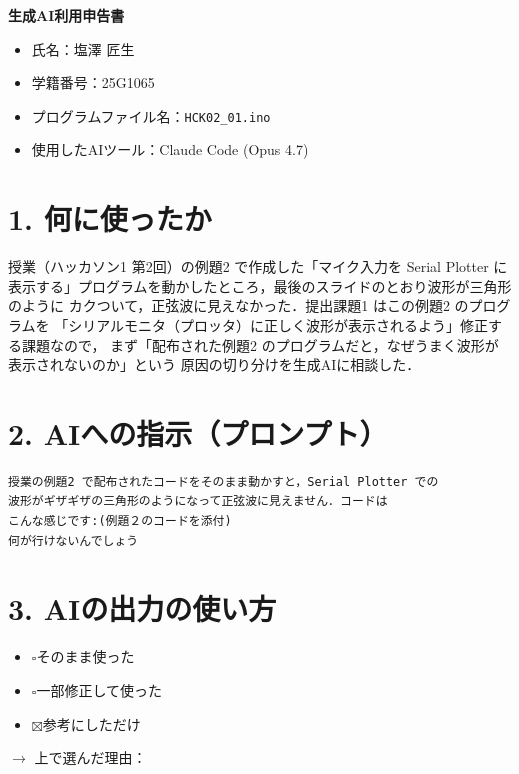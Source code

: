 \documentclass[a4paper,11pt,dvipdfmx]{jsarticle}
\newcommand{\cboxon}{$\boxtimes$}
\newcommand{\cboxoff}{$\square$}
\begin{document}
{\LARGE\bfseries 生成AI利用申告書}

\begin{itemize}
  \item 氏名：塩澤 匠生
  \item 学籍番号：25G1065
  \item プログラムファイル名：\texttt{HCK02\_01.ino}
  \item 使用したAIツール：Claude Code (Opus 4.7)
\end{itemize}

\section*{1. 何に使ったか}
授業（ハッカソン1 第2回）の例題2 で作成した「マイク入力を Serial Plotter に
表示する」プログラムを動かしたところ，最後のスライドのとおり波形が三角形のように
カクついて，正弦波に見えなかった．提出課題1 はこの例題2 のプログラムを
「シリアルモニタ（プロッタ）に正しく波形が表示されるよう」修正する課題なので，
まず「配布された例題2 のプログラムだと，なぜうまく波形が表示されないのか」という
原因の切り分けを生成AIに相談した．

\section*{2. AIへの指示（プロンプト）}
\begin{lstlisting}
授業の例題2 で配布されたコードをそのまま動かすと，Serial Plotter での
波形がギザギザの三角形のようになって正弦波に見えません．コードは
こんな感じです:(例題２のコードを添付)
何が行けないんでしょう
\end{lstlisting}

\section*{3. AIの出力の使い方}
\begin{itemize}
  \item \cboxoff そのまま使った
  \item \cboxoff 一部修正して使った
  \item \cboxon 参考にしただけ
\end{itemize}
$\rightarrow$ 上で選んだ理由：
\end{document}
